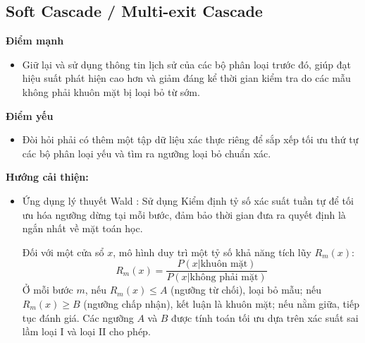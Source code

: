 \subsection{Soft Cascade / Multi-exit Cascade}
\textbf{Điểm mạnh}
\begin{itemize}
    \item Giữ lại và sử dụng thông tin lịch sử của các bộ phân loại trước đó, giúp đạt hiệu suất phát hiện cao hơn và giảm đáng kể thời gian kiểm tra do các mẫu không phải khuôn mặt bị loại bỏ từ sớm.
\end{itemize}
\textbf{Điểm yếu}
\begin{itemize}
    \item Đòi hỏi phải có thêm một tập dữ liệu xác thực riêng để sắp xếp tối ưu thứ tự các bộ phân loại yếu và tìm ra ngưỡng loại bỏ chuẩn xác.
\end{itemize}
\textbf{Hướng cải thiện:}
\begin{itemize}
  \item Ứng dụng lý thuyết Wald \cite{sochman2005waldboost}: Sử dụng Kiểm định tỷ số xác suất tuần tự để tối ưu hóa ngưỡng dừng tại mỗi bước, đảm bảo thời gian đưa ra quyết định là ngắn nhất về mặt toán học.

  Đối với một cửa sổ $x$, mô hình duy trì một tỷ số khả năng tích lũy $R_m(x)$:
    \begin{equation}
        R_m(x) = \frac{P(x | \text{khuôn mặt})}{P(x | \text{không phải mặt})}
    \end{equation}
    Ở mỗi bước $m$, nếu $R_m(x) \le A$ (ngưỡng từ chối), loại bỏ mẫu; nếu $R_m(x) \ge B$ (ngưỡng chấp nhận), kết luận là khuôn mặt; nếu nằm giữa, tiếp tục đánh giá. Các ngưỡng $A$ và $B$ được tính toán tối ưu dựa trên xác suất sai lầm loại I và loại II cho phép.
\end{itemize}

